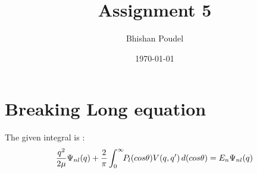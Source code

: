 \documentclass[11pt,a4paper,english]{article}
\title{Assignment 5}
\author{Bhishan Poudel}
\date{\today}
\begin{document}
\maketitle
\tableofcontents
\listoffigures
\clearpage


\section{Breaking Long equation}

The given integral is :\\

	\begin{equation}
	  \frac{q^2}{2\mu} \Psi_{nl}(q) \\
	+ \frac{2}{\pi} \int_{0}^{\infty} \!\! P_{l}(cos\theta) V(q,q')\,d(cos\theta) \\
	 = E_n\Psi_{nl}(q)
	\end{equation}    
\end{document}
